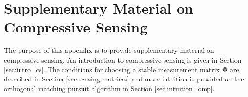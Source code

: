 %							

%								
\graphicspath{{Appendix/figures_B/}} 

\chapter{Supplementary Material on Compressive Sensing}
\label{chap:ap_B}

The purpose of this appendix is to provide supplementary material on compressive sensing. An introduction to compressive sensing is given in Section \ref{sec:intro_cs}. The conditions for choosing a stable measurement matrix $\boldsymbol{\Phi}$ are described in Section \ref{sec:sensing-matrices} and more intuition is provided on the orthogonal matching pursuit algorithm  in Section \ref{sec:intuition_omp}.






